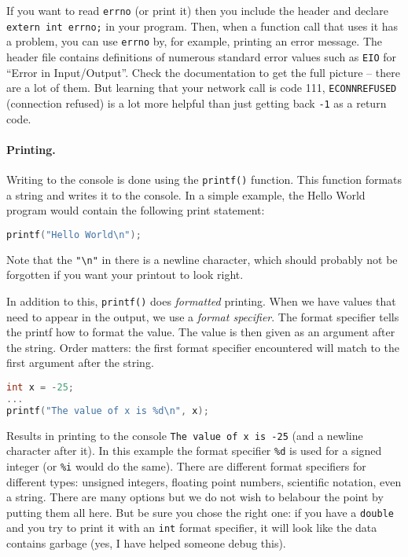 If you want to read \texttt{errno} (or print it) then you include the header and declare \texttt{extern int errno;}  in your program. Then, when a function call that uses it has a problem, you can use \texttt{errno} by, for example, printing an error message. The header file contains definitions of numerous standard error values such as \texttt{EIO} for ``Error in Input/Output''. Check the documentation to get the full picture -- there are a lot of them. But learning that your network call is code 111, \texttt{ECONNREFUSED} (connection refused) is a lot more helpful than just getting back \texttt{-1} as a return code.


\paragraph{Printing.}

Writing to the console is done using the \texttt{printf()} function. This function formats a string and writes it to the console. In a simple example, the Hello World program would contain the following print statement:

\begin{lstlisting}[language=C]
printf("Hello World\n");
\end{lstlisting}

Note that the \texttt{"\textbackslash n"} in there is a newline character, which should probably not be forgotten if you want your printout to look right.

In addition to this, \texttt{printf()} does \textit{formatted} printing. When we have values that need to appear in the output, we use a \textit{format specifier}. The format specifier tells the printf how to format the value. The value is then given as an argument after the string. Order matters: the first format specifier encountered will match to the first argument after the string.

\begin{lstlisting}[language=C]
int x = -25;
...
printf("The value of x is %d\n", x);
\end{lstlisting}

Results in printing to the console \texttt{The value of x is -25} (and a newline character after it). In this example the format specifier \texttt{\%d} is used for a signed integer (or \texttt{\%i} would do the same). There are different format specifiers for different types: unsigned integers, floating point numbers, scientific notation, even a string. There are many options but we do not wish to belabour the point by putting them all here. But be sure you chose the right one: if you have a \texttt{double} and you try to print it with an \texttt{int} format specifier, it will look like the data contains garbage (yes, I have helped someone debug this).


